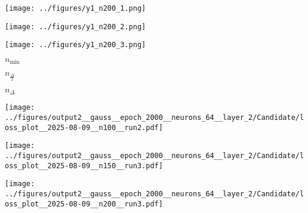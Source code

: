 \begin{otherlanguage}{ngerman}
\begin{samepage}
\begin{minipage}{\textwidth}
\vspace{0.125cm}

\begin{minipage}{0.05\textwidth}\centering{}\end{minipage}%
\begin{minipage}{0.3\textwidth}\centering\texttt{[image: ../figures/y1\_n200\_1.png]}\end{minipage}%
\begin{minipage}{0.3\textwidth}\centering\texttt{[image: ../figures/y1\_n200\_2.png]}\end{minipage}%
\begin{minipage}{0.3\textwidth}\centering\texttt{[image: ../figures/y1\_n200\_3.png]}\end{minipage}

\label{fig:matrix_plot_gauss}

\begin{minipage}{0.05\textwidth}\vspace{0.5cm}\end{minipage}%
\begin{minipage}{0.3\textwidth}\centering \textbf{$n_{\mathrm{min}}$}\end{minipage}%
\begin{minipage}{0.3\textwidth}\centering \textbf{$n_{\frac{\Delta}{2}}$}\end{minipage}%
\begin{minipage}{0.3\textwidth}\centering \textbf{$n_{\Delta}$}\end{minipage}

\vspace{0.125cm}

\begin{minipage}{0.05\textwidth}\centering{}\end{minipage}%
\begin{minipage}{0.3\textwidth}
    \centering
    \texttt{[image: ../figures/output2\_\_gauss\_\_epoch\_2000\_\_neurons\_64\_\_layer\_2/Candidate/loss\_plot\_\_2025-08-09\_\_n100\_\_run2.pdf]}
\end{minipage}%
\begin{minipage}{0.3\textwidth}
    \centering
    \texttt{[image: ../figures/output2\_\_gauss\_\_epoch\_2000\_\_neurons\_64\_\_layer\_2/Candidate/loss\_plot\_\_2025-08-09\_\_n150\_\_run3.pdf]}
\end{minipage}%
\begin{minipage}{0.3\textwidth}
    \centering
    \texttt{[image: ../figures/output2\_\_gauss\_\_epoch\_2000\_\_neurons\_64\_\_layer\_2/Candidate/loss\_plot\_\_2025-08-09\_\_n200\_\_run3.pdf]}
\end{minipage}


\end{minipage}
\end{samepage}
\end{otherlanguage}
